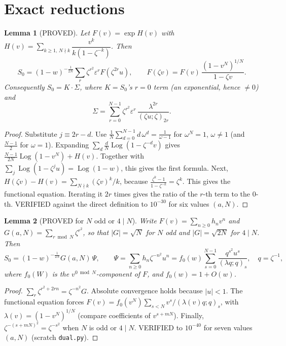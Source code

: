\documentclass[11pt]{article}
\newtheorem{lemma}{Lemma}\newtheorem{proposition}[lemma]{Proposition}
\theoremstyle{remark}\newtheorem{remark}[lemma]{Remark}
\begin{document}
\section{Exact reductions}
\begin{lemma}[PROVED]\label{lem:tel}
Let $F(v)=\exp H(v)$ with $H(v)=\sum_{k\ge1,\,N\nmid k}\dfrac{v^k}{k(1-\zeta^{-k})}$. Then
\[S_0=(1-w)^{-\frac1{2N}}\sum_{r}\zeta^{r^2}\varepsilon^rF(\zeta^{2r}u),\qquad F(\zeta v)=F(v)\,\frac{(1-v^N)^{1/N}}{1-\zeta v}.\]
Consequently $S_0=K\cdot\Sigma$, where $K=S_0$'s $r=0$ term (an exponential, hence $\ne0$) and
\[\Sigma=\sum_{r=0}^{N-1}\zeta^{r^2}\varepsilon^r\,\frac{\lambda^{2r}}{(\zeta u;\zeta)_{2r}}.\]
\end{lemma}
\begin{proof}
Substitute $j\equiv2r-d$. Use $\frac1N\sum_{d=0}^{N-1}d\,\omega^d=\frac1{\omega-1}$ for $\omega^N=1$, $\omega\ne1$ (and $\frac{N-1}2$ for $\omega=1$). Expanding $\sum_d\frac dN\operatorname{Log}(1-\zeta^{-d}v)$ gives $\frac{N-1}{2N}\operatorname{Log}(1-v^N)+H(v)$. Together with $\sum_j\operatorname{Log}(1-\zeta^ju)=\operatorname{Log}(1-w)$, this gives the first formula.
Next, $H(\zeta v)-H(v)=\sum_{N\nmid k}(\zeta v)^k/k$, because $\frac{\zeta^k-1}{1-\zeta^{-k}}=\zeta^k$. This gives the functional equation. Iterating it $2r$ times gives the ratio of the $r$-th term to the $0$-th.
VERIFIED against the direct definition to $10^{-30}$ for six values $(a,N)$.
\end{proof}

\begin{lemma}[PROVED for $N$ odd or $4\mid N$]\label{lem:gauss}
Write $F(v)=\sum_{n\ge0}h_nv^n$ and $G(a,N)=\sum_{r\bmod N}\zeta^{r^2}$, so that $|G|=\sqrt N$ for $N$ odd and $|G|=\sqrt{2N}$ for $4\mid N$. Then
\[S_0=(1-w)^{-\frac1{2N}}G(a,N)\,\Psi,\qquad \Psi=\sum_{n\ge0}h_n\zeta^{-n^2}u^n=f_0(w)\sum_{s=0}^{N-1}\frac{q^{s^2}u^s}{(\lambda q;q)_s},\quad q=\zeta^{-1},\]
where $f_0(W)$ is the $v^{0\bmod N}$-component of $F$, and $f_0(w)=1+O(w)$.
\end{lemma}
\begin{proof}
$\sum_r\zeta^{r^2+2rn}=\zeta^{-n^2}G$. Absolute convergence holds because $|u|<1$.
The functional equation forces $F(v)=f_0(v^N)\sum_{s<N}v^s/(\lambda(v)q;q)_s$, with $\lambda(v)=(1-v^N)^{1/N}$ (compare coefficients of $v^{s+mN}$).
Finally, $\zeta^{-(s+mN)^2}=\zeta^{-s^2}$ when $N$ is odd or $4\mid N$.
VERIFIED to $10^{-40}$ for seven values $(a,N)$ (scratch \texttt{dual.py}).
\end{proof}
\end{document}
